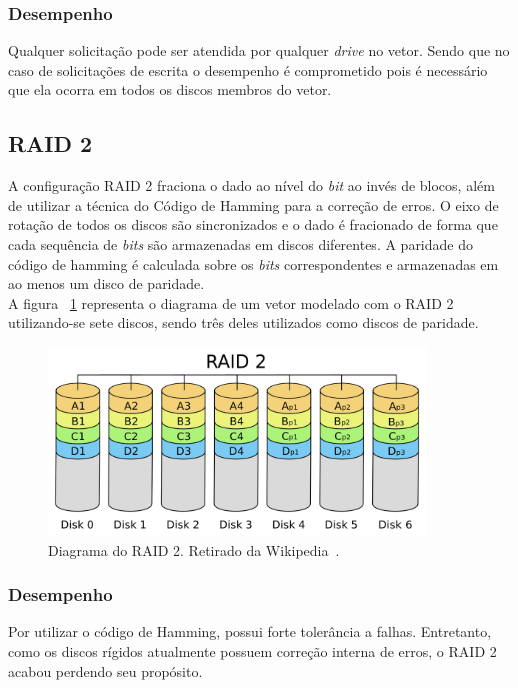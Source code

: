 		\subsubsection{Desempenho}
		
		Qualquer solicitação pode ser atendida por qualquer \textit{drive} no vetor. Sendo que no caso de solicitações de escrita o desempenho é comprometido pois é necessário que ela ocorra em todos os discos membros do vetor. \\
		
		\subsection{RAID 2}
		
		A configuração RAID 2 fraciona o dado ao nível do \textit{bit} ao invés de blocos, além de utilizar a técnica do Código de Hamming para a correção de erros. O eixo de rotação de todos os discos são sincronizados e o dado é fracionado de forma que cada sequência de \textit{bits} são armazenadas em discos diferentes. A paridade do código de hamming é calculada sobre os \textit{bits} correspondentes e armazenadas em ao menos um disco de paridade.\\
		
		A figura ~\ref{fig:raid2} representa o diagrama de um vetor modelado com o RAID 2 utilizando-se sete discos, sendo três deles utilizados como discos de paridade.\\
		
		\begin{figure}[htb]
			\begin{center}
				
				\includegraphics[clip,width=10.0cm]{images/RAID_2.png}
				\caption{Diagrama do RAID 2. Retirado da Wikipedia~\citep{wikiRAIDlevels}.}
				\label{fig:raid2}
			\end{center}
		\end{figure} 
		
		\subsubsection{Desempenho}
		Por utilizar o código de Hamming, possui forte tolerância a falhas. Entretanto, como os discos rígidos atualmente possuem correção interna de erros, o RAID 2 acabou perdendo seu propósito. 
	
